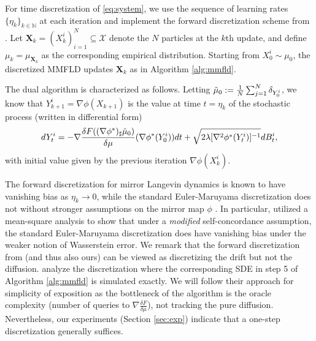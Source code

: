 \documentclass{article}
\begin{document}
For time discretization of \eqref{eq:system}, we use the sequence of learning rates $\{\eta_k\}_{k\in\mathbb{N}}$ at each iteration and implement the forward discretization scheme from \citet{ahn2021efficient}. Let $\mathbf{X}_k= (X_k^i)_{i=1}^N\subseteq\mathcal{X}$ denote the $N$ particles at the $k$th update, and define $\mu_k = \mu_{\mathbf{X}_k}$ as the corresponding empirical distribution. Starting from $X_0^i\sim \mu_0$, the discretized MMFLD updates $\mathbf{X}_k$ as in Algorithm \ref{alg:mmfld}.

The dual algorithm is characterized as follows. Letting $\Tilde{\mu}_0 := \frac{1}{N}\sum_{j=1}^N\delta_{Y_0^i}$,  we know that $Y_{k+1}^i = \nabla\phi(X_{k+1})$ is the value at time $t = \eta_{k}$ of the stochastic process (written in differential form) 
\begin{equation}\label{eq:pre_weighted}
dY_t^{i} = - \nabla \frac{\delta F((\nabla\phi^*)_\sharp\Tilde{\mu}_0)}{\delta\mu}(\nabla \phi^*(Y_0^i))dt+\sqrt{2\lambda[\nabla^2\phi^*(Y_t^i)]^{-1}}dB_t^i, 
\end{equation}
with initial value given by the previous iteration $\nabla\phi(X_k^i)$. 

The forward discretization for mirror Langevin dynamics is known to have vanishing bias as $\eta_k\to 0$, while the standard Euler-Maruyama discretization does not \citep{ahn2021efficient,jiang2021mirror} without stronger assumptions on the mirror map $\phi$ \citep{li2022mirror}. In particular, \citet{li2022mirror} utilized a mean-square analysis \citep{li2019stochastic,li2021} to show that under a \emph{modified} self-concordance assumption, the standard Euler-Maruyama discretization does have vanishing bias under the weaker notion of Wasserstein error. We remark that the forward discretization from \citet{ahn2021efficient} (and thus also ours) can be viewed as discretizing the drift but not the diffusion. \citet{ahn2021efficient,jiang2021mirror} analyze the discretization where the corresponding SDE in step 5 of Algorithm \ref{alg:mmfld} is simulated exactly. We will follow their approach for simplicity of exposition as the bottleneck of the algorithm is the oracle complexity (number of queries to $\nabla \frac{\delta F}{\delta\mu}$), not tracking the pure diffusion. Nevertheless, our experiments (Section \ref{sec:exp}) indicate that a one-step discretization generally suffices.
\end{document}
